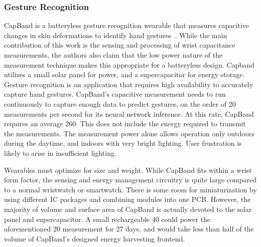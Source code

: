 %

\subsubsection{Gesture Recognition}
CapBand is a batteryless gesture recognition wearable that measures capacitive changes in skin deformations to identify hand gestures~\cite{truong2018capband}.
While the main contribution of this work is the sensing and processing of wrist capacitance measurements, the authors also claim that the low power nature of the measurement technique makes this appropriate for a batteryless design.
Capband utilizes a small solar panel for power, and a supercapacitor for energy storage.
Gesture recognition is an application that requires high availability to accurately capture hand gestures.
CapBand's capacitive measurement needs to run continuously to capture enough data to predict gestures, on the order of 20 measurements per second for its neural network inference.
At this rate, CapBand requires an average 260\ssi{\micro\watt}. This does not include the energy required to transmit the measurements.
The measurement power alone allows operation only outdoors during the daytime, and indoors with very bright lighting.
User frustration is likely to arise in insufficient lighting.

Wearables must optimize for size and weight. While CapBand fits within a wrist form factor, the sensing and energy management circuitry is quite large compared to a normal wristwatch or smartwatch. There is some room for miniaturization by using different IC packages and combining modules into one PCB.
However, the majority of volume and surface area of CapBand is actually devoted to the solar panel and supercapacitor.
A small rechargeable 40\ssi{\milli\ampere\hour} could power the aforementioned 20\ssi{\hertz} measurement for 27 days, and would take less than half of the volume of CapBand's designed energy harvesting frontend.

